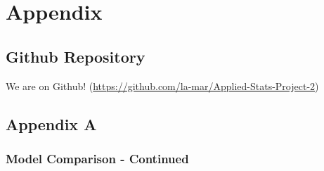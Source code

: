 \chapter{Appendix}\label{chap:appendix}

\section{Github Repository}\label{github}

We are on Github! (\url{https://github.com/la-mar/Applied-Stats-Project-2})

\section{Appendix A}\label{appendix-a}



\subsection{Model Comparison - Continued}\label{moremodelcomp}

\begin{figure}[!hb]
\end{figure}

